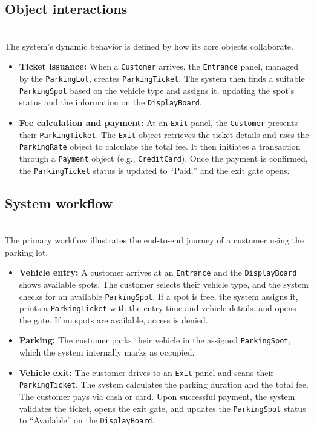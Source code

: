 \subsection{Object interactions}\label{SZFYTGEfxeZVWB802Gx9g}
\\
The system's dynamic behavior is defined by how its core objects collaborate.

\begin{itemize}
\item
\protect{}\label{siph7Dc0KAOZEWlCUl7H5}
\textbf{Ticket issuance:} When a \texttt{Customer} arrives, the \texttt{Entrance} panel, managed by the \texttt{ParkingLot}, creates \texttt{ParkingTicket}. The system then finds a suitable \texttt{ParkingSpot} based on the vehicle type and assigns it, updating the spot's status and the information on the \texttt{DisplayBoard}.
\item
\protect{}\label{ywHvjD7f5EMJbVlwHcg-b}
\textbf{Fee calculation and payment:} At an \texttt{Exit} panel, the \texttt{Customer} presents their \texttt{ParkingTicket}. The \texttt{Exit} object retrieves the ticket details and uses the \texttt{ParkingRate} object to calculate the total fee. It then initiates a transaction through a \texttt{Payment} object (e.g., \texttt{CreditCard}). Once the payment is confirmed, the \texttt{ParkingTicket} status is updated to ``Paid,'' and the exit gate opens.
\end{itemize}

\subsection{System workflow}\label{lE3xv2whb2ohAebUX0hMx}
\\
The primary workflow illustrates the end-to-end journey of a customer using the parking lot.

\begin{itemize}
\item
\protect{}\label{i7o7tcjar2AmkxYaLcZsw}
\textbf{Vehicle entry:} A customer arrives at an \texttt{Entrance} and the \texttt{DisplayBoard} shows available spots. The customer selects their vehicle type, and the system checks for an available \texttt{ParkingSpot}. If a spot is free, the system assigns it, prints a \texttt{ParkingTicket} with the entry time and vehicle details, and opens the gate. If no spots are available, access is denied.
\item
\protect{}\label{bivOFC8nArE_HboR5DhnO}
\textbf{Parking:} The customer parks their vehicle in the assigned \texttt{ParkingSpot}, which the system internally marks as occupied.
\item
\protect{}\label{G1lvvKUXYvdSNzQx3g0wi}
\textbf{Vehicle exit:} The customer drives to an \texttt{Exit} panel and scans their \texttt{ParkingTicket}. The system calculates the parking duration and the total fee. The customer pays via cash or card. Upon successful payment, the system validates the ticket, opens the exit gate, and updates the \texttt{ParkingSpot} status to ``Available'' on the \texttt{DisplayBoard}.
\end{itemize}

